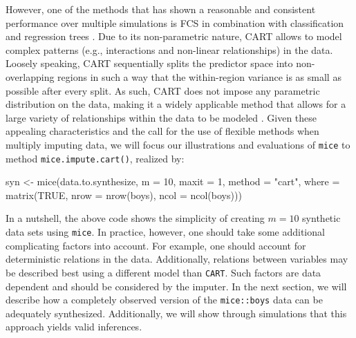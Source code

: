 \documentclass[psych,article,submit,moreauthors,pdftex]{mdpi}
\newenvironment{Shaded}{\begin{snugshade}}{\end{snugshade}}
\newcommand{\AttributeTok}[1]{\textcolor[rgb]{0.77,0.63,0.00}{#1}}
\newcommand{\ConstantTok}[1]{\textcolor[rgb]{0.00,0.00,0.00}{#1}}
\newcommand{\DecValTok}[1]{\textcolor[rgb]{0.00,0.00,0.81}{#1}}
\newcommand{\FunctionTok}[1]{\textcolor[rgb]{0.00,0.00,0.00}{#1}}
\newcommand{\NormalTok}[1]{#1}
\newcommand{\OtherTok}[1]{\textcolor[rgb]{0.56,0.35,0.01}{#1}}
\newcommand{\StringTok}[1]{\textcolor[rgb]{0.31,0.60,0.02}{#1}}
\begin{document}
However, one of the methods that has shown a reasonable and consistent
performance over multiple simulations
\citep[e.g.,][]{reiter_cart_2005, burgette_reiter_cart_2010, doove_buuren_recursive_2014, raab_practical_2016}
is FCS in combination with classification and regression trees
\citep[CART;][]{breiman_cart_1984}. Due to its non-parametric nature,
CART allows to model complex patterns (e.g., interactions and non-linear
relationships) in the data. Loosely speaking, CART sequentially splits
the predictor space into non-overlapping regions in such a way that the
within-region variance is as small as possible after every split. As
such, CART does not impose any parametric distribution on the data,
making it a widely applicable method that allows for a large variety of
relationships within the data to be modeled \citep{islr_2013}. Given
these appealing characteristics and the call for the use of flexible
methods when multiply imputing data, we will focus our illustrations and
evaluations of \texttt{mice} to method \texttt{mice.impute.cart()},
realized by:

\begin{Shaded}
\begin{Highlighting}[]
\NormalTok{syn }\OtherTok{\textless{}{-}} \FunctionTok{mice}\NormalTok{(data.to.synthesize, }
            \AttributeTok{m =} \DecValTok{10}\NormalTok{,}
            \AttributeTok{maxit =} \DecValTok{1}\NormalTok{, }
            \AttributeTok{method =} \StringTok{"cart"}\NormalTok{,}
            \AttributeTok{where =} \FunctionTok{matrix}\NormalTok{(}\ConstantTok{TRUE}\NormalTok{, }
                           \AttributeTok{nrow =} \FunctionTok{nrow}\NormalTok{(boys),}
                           \AttributeTok{ncol =} \FunctionTok{ncol}\NormalTok{(boys)))}
\end{Highlighting}
\end{Shaded}

In a nutshell, the above code shows the simplicity of creating
\(m = 10\) synthetic data sets using \texttt{mice}. In practice,
however, one should take some additional complicating factors into
account. For example, one should account for deterministic relations in
the data. Additionally, relations between variables may be described
best using a different model than \texttt{CART}. Such factors are data
dependent and should be considered by the imputer. In the next section,
we will describe how a completely observed version of the
\texttt{mice::boys} data \citep{fredriks_boys_2000} can be adequately
synthesized. Additionally, we will show through simulations that this
approach yields valid inferences.
\end{document}
